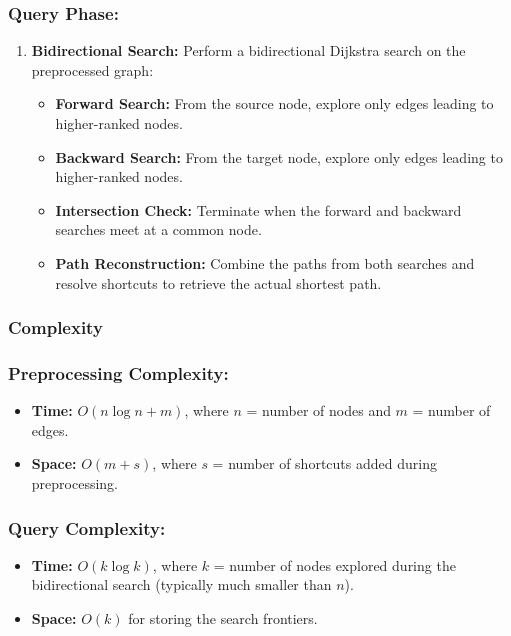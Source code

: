 	\subsubsection*{Query Phase:}
	\begin{enumerate}
		\item \textbf{Bidirectional Search:} Perform a bidirectional Dijkstra search on the preprocessed graph:
		\begin{itemize}
			\item \textbf{Forward Search:} From the source node, explore only edges leading to higher-ranked nodes.
			\item \textbf{Backward Search:} From the target node, explore only edges leading to higher-ranked nodes.
			\item \textbf{Intersection Check:} Terminate when the forward and backward searches meet at a common node.
			\item \textbf{Path Reconstruction:} Combine the paths from both searches and resolve shortcuts to retrieve the actual shortest path.
		\end{itemize}
	\end{enumerate}
	\subsubsection{Complexity}
	\subsubsection*{Preprocessing Complexity:}
	\begin{itemize}
		\item \textbf{Time:} \(O(n \log n + m)\), where \(n\) = number of nodes and \(m\) = number of edges.
		\item \textbf{Space:} \(O(m+s)\), where \(s\) = number of shortcuts added during preprocessing.
	\end{itemize}
	
	\subsubsection*{Query Complexity:}
	\begin{itemize}
		\item \textbf{Time:} \(O(k \log k)\), where \(k\) = number of nodes explored during the bidirectional search (typically much smaller than \(n\)).
		\item \textbf{Space:} \(O(k)\) for storing the search frontiers.
	\end{itemize}
	
